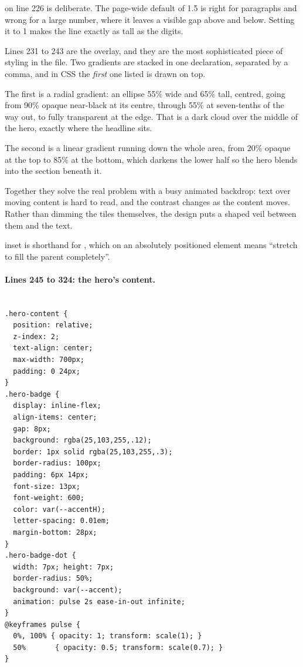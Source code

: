 on line 226 is deliberate. The page-wide default of 1.5 is
right for paragraphs and wrong for a large number, where it leaves a visible gap
above and below. Setting it to 1 makes the line exactly as tall as the digits.

Lines 231 to 243 are the overlay, and they are the most sophisticated piece of
styling in the file. Two gradients are stacked in one declaration, separated by a
comma, and in CSS the \emph{first} one listed is drawn on top.

The first is a radial gradient: an ellipse 55\% wide and 65\% tall, centred, going
from 90\% opaque near-black at its centre, through 55\% at seven-tenths of the way
out, to fully transparent at the edge. That is a dark cloud over the middle of the
hero, exactly where the headline sits.

The second is a linear gradient running down the whole area, from 20\% opaque at
the top to 85\% at the bottom, which darkens the lower half so the hero blends into
the section beneath it.

Together they solve the real problem with a busy animated backdrop: text over
moving content is hard to read, and the contrast changes as the content moves.
Rather than dimming the tiles themselves, the design puts a shaped veil between
them and the text.

\begin{jargon}{inset}
 is shorthand for ,
which on an absolutely positioned element means ``stretch to fill the parent
completely''.
\end{jargon}

\paragraph{Lines 245 to 324: the hero's content.}

\begin{lstlisting}[firstnumber=244,caption={\file{css/site.css}, lines 244--275}]

.hero-content {
  position: relative;
  z-index: 2;
  text-align: center;
  max-width: 700px;
  padding: 0 24px;
}
.hero-badge {
  display: inline-flex;
  align-items: center;
  gap: 8px;
  background: rgba(25,103,255,.12);
  border: 1px solid rgba(25,103,255,.3);
  border-radius: 100px;
  padding: 6px 14px;
  font-size: 13px;
  font-weight: 600;
  color: var(--accentH);
  letter-spacing: 0.01em;
  margin-bottom: 28px;
}
.hero-badge-dot {
  width: 7px; height: 7px;
  border-radius: 50%;
  background: var(--accent);
  animation: pulse 2s ease-in-out infinite;
}
@keyframes pulse {
  0%, 100% { opacity: 1; transform: scale(1); }
  50%       { opacity: 0.5; transform: scale(0.7); }
}
\end{lstlisting}

